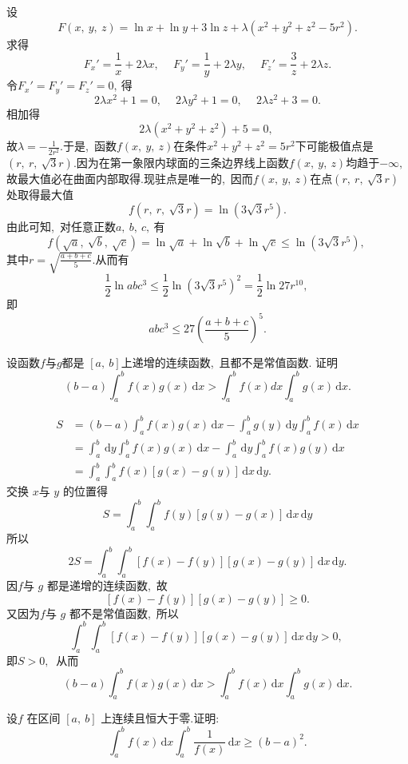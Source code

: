 	\begin{solution}
		设
		$$F(x,\ y,\ z)=\ln x+\ln y+3\ln z+\lambda(x^2+y^2+z^2-5r^2).$$
		求得
		$$F_x'=\frac{1}{x}+2\lambda x,\ \quad F_y'=\frac{1}{y}+2\lambda y,\ \quad F_z'=\frac{3}{z}+2\lambda z.$$
		令$F_x'=F_y'=F_z'=0,\ $得
		$$2\lambda x^2+1=0,\ \quad 2\lambda y^2+1=0,\ \quad 2\lambda z^2+3=0.$$
		相加得
		$$2\lambda(x^2+y^2+z^2)+5=0,\ $$
		故$\lambda=-\frac{1}{2r^2}.$于是,\ 函数$f(x,\ y,\ z)$在条件$x^2+y^2+z^2=5r^2$下可能极值点是$\left(r,\ r,\ \sqrt{3}r\right).$因为在第一象限内球面的三条边界线上函数$f(x,\ y,\ z)$均趋于$-\infty,\ $故最大值必在曲面内部取得.现驻点是唯一的,\ 因而$f(x,\ y,\ z)$在点$\left(r,\ r,\ \sqrt{3}r\right)$处取得最大值
		$$f(r,\ r,\ \sqrt{3}r)=\ln(3\sqrt{3}r^5).$$
		由此可知,\ 对任意正数$a,\ b,\ c,\ $有
		$$f(\sqrt{a},\ \sqrt{b},\ \sqrt{c})=\ln\sqrt{a}+\ln\sqrt{b}+\ln\sqrt{c}\le\ln(3\sqrt{3}r^5),\ $$
		其中$r=\sqrt{\frac{a+b+c}{5}}.$从而有
		$$\frac{1}{2}\ln abc^3\le\frac{1}{2}\ln(3\sqrt{3}r^5)^2=\frac{1}{2}\ln27r^10,\ $$
		即
		$$abc^3\le 27\left(\frac{a+b+c}{5}\right)^5.$$ 
	\end{solution}
	\newpage
	\begin{problem}
		设函数$  f  $与$  g  $都是 $\left[a,\  b\right]$上递增的连续函数,\  且都不是常值函数. 证明
		$$(b-a) \int_{a}^{b} f(x) g(x)\,\text{d} x>\int_{a}^{b} f(x) d x \int_{a}^{b} g(x) \,\text{d} x .$$
	\end{problem}
	
	\begin{solution}
		\begin{align*}
			S &=(b-a) \int_{a}^{b} f(x) g(x)\,\text{d}x-\int_{a}^{b} g(y)\,\text{d} y \int_{a}^{b} f(x) \,\text{d}x \\
			&=\int_{a}^{b} \,\text{d} y \int_{a}^{b} f(x) g(x) \,\text{d}x-\int_{a}^{b} \,\text{d} y \int_{a}^{b} f(x) g(y) \,\text{d} x \\
			&=\int_{a}^{b} \int_{a}^{b} f(x)[g(x)-g(y)] \,\text{d}x\,\text{d} y .
		\end{align*}
		交换 $ x  $与  $y$  的位置得
		$$S=\int_{a}^{b} \int_{a}^{b} f(y)[g(y)-g(x)] \,\text{d}x \,\text{d}y$$
		所以
		$$2 S=\int_{a}^{b} \int_{a}^{b}[f(x)-f(y)][g(x)-g(y)] \,\text{d} x \,\text{d}y .$$
		因$  f  $与 $ g$  都是递增的连续函数,\  故
		$$[f(x)-f(y)][g(x)-g(y)] \geqslant 0 .$$
		又因为$  f  $与 $ g$  都不是常值函数,\  所以
		$$\int_{a}^{b} \int_{a}^{b}[f(x)-f(y)][g(x)-g(y)] \,\text{d} x \,\text{d}y>0,\ $$
		即$  S>0 ,\ $ 从而
		$$(b-a) \int_{a}^{b} f(x) g(x)\,\text{d}x>\int_{a}^{b} f(x) \,\text{d}x \int_{a}^{b} g(x)\,\text{d}x.$$ 
	\end{solution}
	\newpage
	\begin{problem}
		设$f $ 在区间  $[a,\  b] $ 上连续且恒大于零.证明:
		$$\int_{a}^{b} f(x) \,\text{d} x \int_{a}^{b} \frac{1}{f(x)} \,\text{d} x \geqslant(b-a)^{2} .$$
	\end{problem}
	

